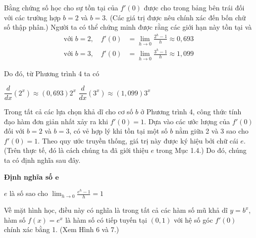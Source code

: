 \begin{minipage}[t]{0.69\textwidth}
    \fontsize{9.5pt}{13.2pt}\selectfont
    \setlength{\parindent}{1.5em}
    \setlength{\parskip}{0pt}

    \noindent
    Bằng chứng số học cho sự tồn tại của $f'(0)$ được cho trong bảng bên trái đối với các trường hợp $b = 2$ và $b = 3$. (Các giá trị được nêu chính xác đến bốn chữ số thập phân.) Người ta có thể chứng minh được rằng các giới hạn này tồn tại và
    \begin{align*}
        \text{với } b = 2, \quad f'(0) &= \lim_{h \to 0} \frac{2^h - 1}{h} \approx 0{,}693 \\[4pt]
        \text{với } b = 3, \quad f'(0) &= \lim_{h \to 0} \frac{3^h - 1}{h} \approx 1{,}099
    \end{align*}

    \noindent
    Do đó, từ Phương trình 4 ta có
    \vspace{2pt}

    \noindent
    \hfill
    $\dfrac{d}{dx}(2^x) \approx (0{,}693)2^x$
    \qquad\qquad\quad
    $\dfrac{d}{dx}(3^x) \approx (1{,}099)3^x$
    \hfill\null
    \vspace{6pt}

    Trong tất cả các lựa chọn khả dĩ cho cơ số $b$ ở Phương trình 4, công thức tính đạo hàm đơn giản nhất xảy ra khi $f'(0) = 1$. Dựa vào các ước lượng của $f'(0)$ đối với $b = 2$ và $b = 3$, có vẻ hợp lý khi tồn tại một số $b$ nằm giữa 2 và 3 sao cho $f'(0) = 1$. Theo quy ước truyền thống, giá trị này được ký hiệu bởi chữ cái $e$. (Trên thực tế, đó là cách chúng ta đã giới thiệu $e$ trong Mục 1.4.) Do đó, chúng ta có định nghĩa sau đây.
    \vspace{6pt}

    \begin{definitionbox}
        {\bfseries\textsf{\color{stewartred}Định nghĩa số $\boldsymbol{e}$}}\par
        \vspace{4pt}
        \noindent $e$ là số sao cho \qquad $\displaystyle\lim_{h \to 0} \frac{e^h - 1}{h} = 1$
    \end{definitionbox}
    \vspace{6pt}

    Về mặt hình học, điều này có nghĩa là trong tất cả các hàm số mũ khả dĩ $y = b^x$, hàm số $f(x) = e^x$ là hàm số có tiếp tuyến tại $(0, 1)$ với hệ số góc $f'(0)$ chính xác bằng 1. (Xem Hình 6 và 7.)
    \vspace{6pt}


\end{minipage}
